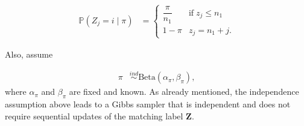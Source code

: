 \documentclass[ba]{imsart}
\newcommand{\bZ}{\boldsymbol{Z}}
\newcommand{\bgamma}{\boldsymbol{\gamma}}
\begin{document}
\begin{align}
\mathbb{P}(Z_j = i \mid \pi) 
&=
\begin{cases}
 \dfrac{\pi}{n_1}  &  \text{if}  \; z_j \leq n_1\\
  1- \pi & z_j = n_1 + j.
\end{cases}
\end{align}

Also, assume 

\begin{align}
  \pi &\stackrel{ind}{\sim} \text{Beta}(\alpha_{\pi}, \beta_{\pi}),
\end{align}
where $\alpha_{\pi}$ and $\beta_{\pi}$ are fixed and known. As already mentioned, the independence assumption above leads to a Gibbs sampler that is independent and does not require sequential updates of the matching label $\bZ.$



%
\end{document}
